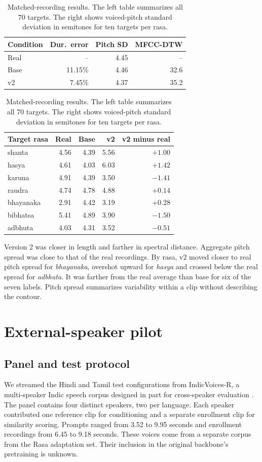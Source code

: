 \documentclass[11pt,a4paper]{article}
\newcommand{\sectionpage}[1]{\clearpage\section{#1}}
\begin{document}
\begin{table}[!h]
\centering
\caption{Matched-recording results. The left table summarizes all 70 targets. The right shows voiced-pitch standard deviation in semitones for ten targets per rasa.}
{\small\setlength{\tabcolsep}{3pt}
\begin{minipage}[t]{.49\linewidth}\centering
\begin{tabular}[t]{@{}lrrr@{}}
\toprule
Condition & Dur.\ error & Pitch SD & MFCC-DTW \\
\midrule
Real & -- & 4.45 & -- \\
Base & 11.15\% & 4.46 & 32.6 \\
v2 & 7.45\% & 4.37 & 35.2 \\
\bottomrule
\end{tabular}
\end{minipage}\hfill
\begin{minipage}[t]{.49\linewidth}\centering
\begin{tabular}[t]{@{}lrrrr@{}}
\toprule
Target rasa & Real & Base & v2 & v2 minus real \\
\midrule
shanta    & 4.56 & 4.39 & 5.56 & \(+1.00\) \\
hasya     & 4.61 & 4.03 & 6.03 & \(+1.42\) \\
karuna    & 4.91 & 4.39 & 3.50 & \(-1.41\) \\
raudra    & 4.74 & 4.78 & 4.88 & \(+0.14\) \\
bhayanaka & 2.91 & 4.42 & 3.19 & \(+0.28\) \\
bibhatsa  & 5.41 & 4.89 & 3.90 & \(-1.50\) \\
adbhuta   & 4.03 & 4.31 & 3.52 & \(-0.51\) \\
\bottomrule
\end{tabular}
\end{minipage}}
\end{table}

Version 2 was closer in length and farther in spectral distance. Aggregate pitch spread was close to that of the real recordings. By rasa, v2 moved closer to real pitch spread for \emph{bhayanaka}, overshot upward for \emph{hasya} and crossed below the real spread for \emph{adbhuta}. It was farther from the real average than base for six of the seven labels. Pitch spread summarizes variability within a clip without describing the contour.

\sectionpage{External-speaker pilot}
\subsection{Panel and test protocol}
We streamed the Hindi and Tamil test configurations from IndicVoices-R, a multi-speaker Indic speech corpus designed in part for cross-speaker evaluation \cite{indicvoices}. The panel contains four distinct speakers, two per language. Each speaker contributed one reference clip for conditioning and a separate enrollment clip for similarity scoring. Prompts ranged from 3.52 to 9.95 seconds and enrollment recordings from 6.45 to 9.18 seconds. These voices come from a separate corpus from the Rasa adaptation set. Their inclusion in the original backbone's pretraining is unknown.
\end{document}
